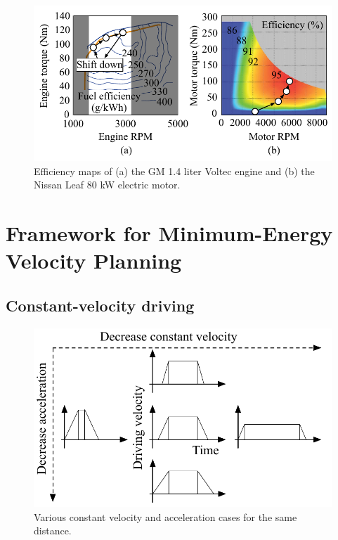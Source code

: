 \documentclass{IEEEtran}
\begin{document}
\begin{figure}	%
\includegraphics[width=1.0\hsize]{Figures/efficiency_maps.pdf}
\caption{Efficiency maps of (a) the GM 1.4 liter Voltec engine and (b) the Nissan Leaf 80 kW electric motor.}
\label{fig:efficiency_map}
\end{figure} 

\section{Framework for Minimum-Energy Velocity Planning} \label{sec:framework}

\subsection{Constant-velocity driving} \label{subsec:constant drive}

\begin{figure} %
\centering
\includegraphics[width=0.9\hsize]{Figures/const_vel_drive_problem.pdf}
\caption{Various constant velocity and acceleration cases for the same distance.}
\label{fig:const_vel_drive_problem}
\end{figure} 
\end{document}
